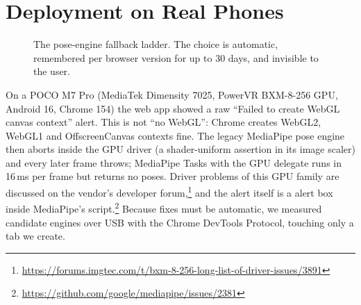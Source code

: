 \section{Deployment on Real Phones}\label{sec:deploy}
\begin{figure}[t]
\centering
\resizebox{0.92\columnwidth}{!}{}
\caption{The pose-engine fallback ladder. The choice is automatic, remembered per browser version for up to 30 days, and invisible to the user.}
\label{fig:ladder}
\end{figure}
 On a POCO M7 Pro (MediaTek Dimensity 7025, PowerVR BXM-8-256 GPU, Android 16, Chrome 154) the web app showed a raw ``Failed to create WebGL canvas context'' alert. This is not ``no WebGL'': Chrome creates WebGL2, WebGL1 and OffscreenCanvas contexts fine. The legacy MediaPipe pose engine then aborts inside the GPU driver (a shader-uniform assertion in its image scaler) and every later frame throws; MediaPipe Tasks with the GPU delegate runs in 16\,ms per frame but returns no poses. Driver problems of this GPU family are discussed on the vendor's developer forum,\footnote{\url{https://forums.imgtec.com/t/bxm-8-256-long-list-of-driver-issues/3891}} and the alert itself is a alert box inside MediaPipe's script.\footnote{\url{https://github.com/google/mediapipe/issues/2381}} Because fixes must be automatic, we measured candidate engines over USB with the Chrome DevTools Protocol, touching only a tab we create.


